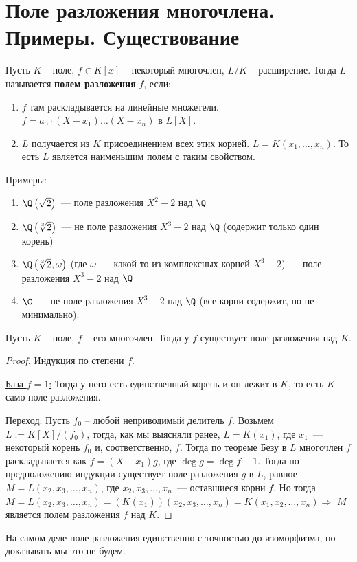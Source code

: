 \section{Поле разложения многочлена. Примеры. Существование}
\begin{conj}
    Пусть $K$ -- поле, $f \in K[x]$ -- некоторый многочлен, $L/K$ -- расширение. Тогда $L$ называется \textbf{полем разложения} $f$, если:
    \begin{enumerate}
        \item $f$ там раскладывается на линейные множетели. $f = a_0 \cdot (X - x_1) \dots (X - x_n)$ в $L[X]$.
        \item $L$ получается из $K$ присоединением всех этих корней. $L = K(x_1, \dots, x_n)$. То есть $L$ является наименьшим полем с таким свойством. 
    \end{enumerate}
\end{conj}
Примеры:
\begin{enumerate}
    \item $\Q\left(\sqrt 2\right)$~--- поле разложения $X^2-2$ над $\Q$
    \item $\Q\left(\sqrt[3]{2}\right)$~--- не поле разложения $X^3-2$ над $\Q$ (содержит только один корень)
    \item $\Q\left(\sqrt[3]{2}, \omega\right)$ (где $\omega$~--- какой-то из комплексных корней $X^3-2$)~--- поле разложения $X^3-2$ над $\Q$
    \item $\C$~--- не поле разложения $X^3-2$ над $\Q$ (все корни содержит, но не минимально).
\end{enumerate}

\begin{theorem}
    Пусть $K$ -- поле, $f$ -- его многочлен. Тогда у $f$ существует поле разложения над $K$. 
\end{theorem}
\begin{proof}
    Индукция по степени $f$. 

    \quad \underline{База $f = 1$:} Тогда у него есть единственный корень и он лежит в $K$, то есть $K$ -- само поле разложения. 

    \quad \underline{Переход:} Пусть $f_0$ -- любой неприводимый делитель $f$.
    Возьмем $L := K[X] / (f_0)$, тогда, как мы выясняли ранее, $L=K(x_1)$, где $x_1$~--- некоторый корень $f_0$ и, соответственно, $f$.
    Тогда по теореме Безу в $L$ многочлен $f$ раскладывается как $f=(X-x_1)g$, где $\deg g = \deg f - 1$.
    Тогда по предположению индукции существует поле разложения $g$ в $L$, равное $M=L(x_2, x_3, \ldots, x_n)$, где $x_2,x_3,\ldots, x_n$~--- оставшиеся корни $f$.
    Но тогда $M=L(x_2, x_3, \ldots, x_n) = (K(x_1))(x_2, x_3, \ldots, x_n) = K(x_1, x_2, \ldots, x_n) \Rightarrow$ $M$ является полем разложения $f$ над $K$.
\end{proof}
\notice На самом деле поле разложения единственно с точностью до изоморфизма, но доказывать мы это не будем.
